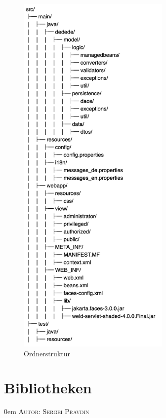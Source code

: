 \documentclass{article}
\makeatletter
\newcommand{\sectionauthor}[1]{
	{\parindent 0em \large \scshape Autor: #1 \par \nobreak \vspace*{1em}}
	\@afterheading
}
\makeatother
\begin{document}
\begin{figure}[H]	
\centering
\includegraphics[width = 20em]{FileStructure}
\caption{Ordnerstruktur}
\end{figure}



\newpage
\section{Bibliotheken}
\sectionauthor{Sergei Pravdin}

\newenvironment{controls}
{
    \begin{table}[H]
        \centering
        \begin{tabular}{ p{7em} p{19em} p{4em} p{12em} }
            \toprule
            \textbf{Bibliothek} & \textbf{Anwendungsbereich} & \textbf{Version} & \textbf{Lizenz}\\
            \midrule
        }
        {
            \bottomrule
        \end{tabular}
    \end{table}
}
\end{document}
